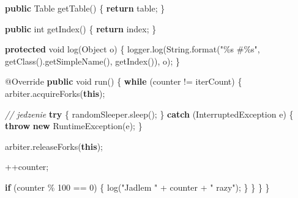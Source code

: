 \documentclass[11pt]{article}
\newenvironment{Shaded}{}{}
\newcommand{\KeywordTok}[1]{\textcolor[rgb]{0.00,0.44,0.13}{\textbf{{#1}}}}
\newcommand{\DataTypeTok}[1]{\textcolor[rgb]{0.56,0.13,0.00}{{#1}}}
\newcommand{\DecValTok}[1]{\textcolor[rgb]{0.25,0.63,0.44}{{#1}}}
\newcommand{\StringTok}[1]{\textcolor[rgb]{0.25,0.44,0.63}{{#1}}}
\newcommand{\CommentTok}[1]{\textcolor[rgb]{0.38,0.63,0.69}{\textit{{#1}}}}
\newcommand{\FunctionTok}[1]{\textcolor[rgb]{0.02,0.16,0.49}{{#1}}}
\newcommand{\NormalTok}[1]{{#1}}
\newcommand{\SpecialCharTok}[1]{\textcolor[rgb]{0.25,0.44,0.63}{{#1}}}
\newcommand{\ControlFlowTok}[1]{\textcolor[rgb]{0.00,0.44,0.13}{\textbf{{#1}}}}
\newcommand{\OperatorTok}[1]{\textcolor[rgb]{0.40,0.40,0.40}{{#1}}}
\newcommand{\BuiltInTok}[1]{{#1}}
\newcommand{\AttributeTok}[1]{\textcolor[rgb]{0.49,0.56,0.16}{{#1}}}
\begin{document}
\begin{Shaded}
\begin{Highlighting}[]
    \KeywordTok{public}\NormalTok{ Table }\FunctionTok{getTable}\OperatorTok{()} \OperatorTok{\{}
        \ControlFlowTok{return}\NormalTok{ table}\OperatorTok{;}
    \OperatorTok{\}}

    \KeywordTok{public} \DataTypeTok{int} \FunctionTok{getIndex}\OperatorTok{()} \OperatorTok{\{}
        \ControlFlowTok{return}\NormalTok{ index}\OperatorTok{;}
    \OperatorTok{\}}

    \KeywordTok{protected} \DataTypeTok{void} \FunctionTok{log}\OperatorTok{(}\BuiltInTok{Object}\NormalTok{ o}\OperatorTok{)} \OperatorTok{\{}
\NormalTok{        logger}\OperatorTok{.}\FunctionTok{log}\OperatorTok{(}\BuiltInTok{String}\OperatorTok{.}\FunctionTok{format}\OperatorTok{(}\StringTok{"}\SpecialCharTok{\%s}\StringTok{ \#}\SpecialCharTok{\%s}\StringTok{"}\OperatorTok{,} \FunctionTok{getClass}\OperatorTok{().}\FunctionTok{getSimpleName}\OperatorTok{(),} \FunctionTok{getIndex}\OperatorTok{()),}\NormalTok{ o}\OperatorTok{);}
    \OperatorTok{\}}

    \AttributeTok{@Override}
    \KeywordTok{public} \DataTypeTok{void} \FunctionTok{run}\OperatorTok{()} \OperatorTok{\{}
        \ControlFlowTok{while} \OperatorTok{(}\NormalTok{counter }\OperatorTok{!=}\NormalTok{ iterCount}\OperatorTok{)} \OperatorTok{\{}
\NormalTok{            arbiter}\OperatorTok{.}\FunctionTok{acquireForks}\OperatorTok{(}\KeywordTok{this}\OperatorTok{);}

            \CommentTok{// jedzenie}
            \ControlFlowTok{try} \OperatorTok{\{}
\NormalTok{                randomSleeper}\OperatorTok{.}\FunctionTok{sleep}\OperatorTok{();}
            \OperatorTok{\}} \ControlFlowTok{catch} \OperatorTok{(}\BuiltInTok{InterruptedException}\NormalTok{ e}\OperatorTok{)} \OperatorTok{\{}
                \ControlFlowTok{throw} \KeywordTok{new} \BuiltInTok{RuntimeException}\OperatorTok{(}\NormalTok{e}\OperatorTok{);}
            \OperatorTok{\}}

\NormalTok{            arbiter}\OperatorTok{.}\FunctionTok{releaseForks}\OperatorTok{(}\KeywordTok{this}\OperatorTok{);}

            \OperatorTok{++}\NormalTok{counter}\OperatorTok{;}

            \ControlFlowTok{if} \OperatorTok{(}\NormalTok{counter }\OperatorTok{\%} \DecValTok{100} \OperatorTok{==} \DecValTok{0}\OperatorTok{)} \OperatorTok{\{}
                \FunctionTok{log}\OperatorTok{(}\StringTok{"Jadlem "} \OperatorTok{+}\NormalTok{ counter }\OperatorTok{+} \StringTok{" razy"}\OperatorTok{);}
            \OperatorTok{\}}
        \OperatorTok{\}}
    \OperatorTok{\}}
\OperatorTok{\}}
\end{Highlighting}
\end{Shaded}
\end{document}
